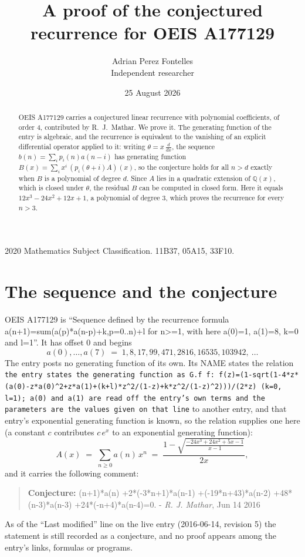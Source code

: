 \documentclass[11pt,a4paper]{article}
\title{A proof of the conjectured recurrence for OEIS A177129}
\author{Adrian Perez Fontelles\\ \small Independent researcher}
\date{25 August 2026}
\theoremstyle{plain}
\theoremstyle{definition}
\begin{document}
\maketitle

\begin{abstract}
OEIS A177129 carries a conjectured linear recurrence with polynomial coefficients, of
order 4, contributed by R.~J.~Mathar. We prove it. The generating function of the
entry is algebraic, and the recurrence is equivalent to the vanishing of an explicit
differential operator applied to it: writing $\theta=x\,\frac{d}{dx}$, the sequence
$b(n)=\sum_{i}p_{i}(n)a(n-i)$ has generating function
$B(x)=\sum_{i}x^{i}\,(p_{i}(\theta+i)A)(x)$, so the conjecture holds for all $n>d$ exactly
when $B$ is a polynomial of degree $d$. Since $A$ lies in a quadratic extension of
$\mathbb{Q}(x)$, which is closed under $\theta$, the residual $B$ can be computed in
closed form. Here it equals $12 x^{3} - 24 x^{2} + 12 x + 1$, a polynomial of degree $3$, which proves
the recurrence for every $n>3$.
\end{abstract}

\noindent\small 2020 Mathematics Subject Classification. 11B37, 05A15, 33F10.\normalsize

\section{The sequence and the conjecture}

OEIS A177129 is ``Sequence defined by the recurrence formula a(n+1)=sum(a(p)*a(n-p)+k,p=0..n)+l for n>=1, with here a(0)=1, a(1)=8, k=0 and l=1''. It has offset $0$ and begins
\[
a(0),\dots,a(7)\;=\;1, 8, 17, 99, 471, 2816, 16535, 103942,\ \dots
\]
The entry posts no generating function of its own. Its NAME states the
relation \texttt{the entry states the generating function as G.f f: f(z)=(1-sqrt(1-4*z*(a(0)-z*a(0)\textasciicircum{}2+z*a(1)+(k+l)*z\textasciicircum{}2/(1-z)+k*z\textasciicircum{}2/(1-z)\textasciicircum{}2)))/(2*z) (k=0, l=1); a(0) and a(1) are read off the entry's own terms and the parameters are the values given on that line} to another entry, and that entry's exponential generating
function is known, so the relation supplies one here (a constant $c$ contributes
$c\,e^{x}$ to an exponential generating function):
\begin{equation}\label{eq:gf}
A(x)\;=\;\sum_{n\ge 0} a(n)\,x^{n}\;=\;\frac{1 - \sqrt{\frac{- 24 x^{3} + 24 x^{2} + 5 x - 1}{x - 1}}}{2 x} ,
\end{equation}
and it carries the following comment:
\begin{quote}\small
\textbf{Conjecture:} (n+1)*a(n) +2*(-3*n+1)*a(n-1) +(-19*n+43)*a(n-2) +48*(n-3)*a(n-3) +24*(-n+4)*a(n-4)=0. - \emph{R. J. Mathar}, Jun 14 2016
\end{quote}
As of the ``Last modified'' line on the live entry (2016-06-14, revision 5) the
statement is still recorded as a conjecture, and no proof appears among the entry's links,
formulas or programs.
\end{document}
